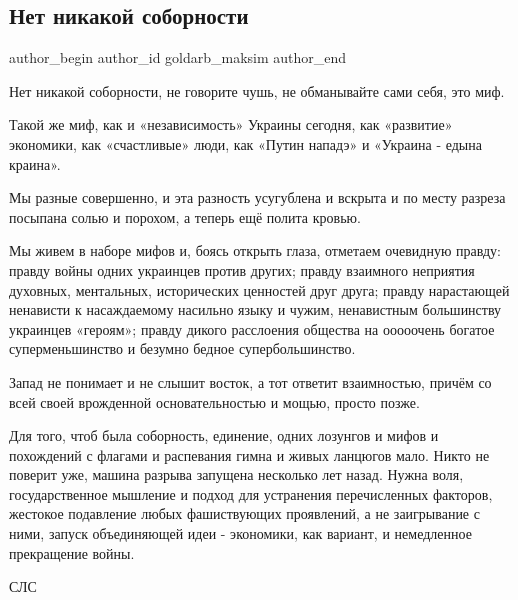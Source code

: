  
 
 
 
 
 
\subsection{Нет никакой соборности}
\label{sec:22_01_2020.fb.goldarb_maksim.1.sobornost}
 
\ifcmt
 author_begin
   author_id goldarb_maksim
 author_end
\fi

Нет никакой соборности, не говорите чушь, не обманывайте сами себя, это миф. 

Такой же миф, как и «независимость» Украины сегодня, как «развитие» экономики,
как «счастливые» люди, как «Путин нападэ» и «Украина - едына краина». 

Мы разные совершенно, и эта разность усугублена и вскрыта и по месту разреза
посыпана солью и порохом, а теперь ещё полита кровью. 


Мы живем в наборе мифов и, боясь открыть глаза, отметаем очевидную правду:
правду войны одних украинцев против других; правду взаимного неприятия
духовных, ментальных, исторических ценностей друг друга; правду нарастающей
ненависти к насаждаемому насильно языку и чужим, ненавистным большинству
украинцев «героям»; правду дикого расслоения общества на ооооочень богатое
суперменьшинство и безумно бедное супербольшинство. 

Запад не понимает и не слышит восток, а тот ответит взаимностью, причём со всей
своей врожденной основательностью и мощью, просто позже. 

Для того, чтоб была соборность, единение, одних лозунгов и мифов и похождений с
флагами и распевания гимна и живых ланцюгов мало. Никто не поверит уже, машина
разрыва запущена несколько лет назад. Нужна воля, государственное мышление и
подход для устранения перечисленных факторов, жестокое подавление любых
фашиствующих проявлений, а не заигрывание с ними, запуск объединяющей идеи -
экономики, как вариант, и немедленное прекращение войны. 

СЛС

